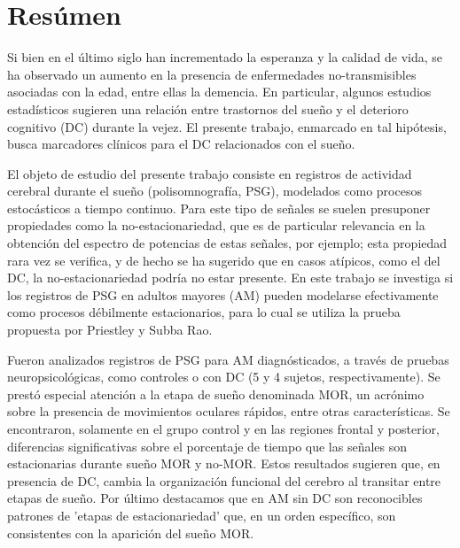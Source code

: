 \documentclass[12pt,a4paper]{mitthesis}
\begin{document}
\setcounter{page}{1}

\chapter*{Res\'umen}

{\small

Si bien en el \'ultimo siglo han incrementado la esperanza y la calidad de vida, se ha observado 
\cite{PlanAlzheimer04} un aumento en la presencia de enfermedades no-transmisibles asociadas con 
la edad, entre ellas la demencia.
En particular, algunos estudios estad\'isticos \cite{Amer13,Miyata13,Potvin12} sugieren una 
relaci\'on entre trastornos del sue\~no y el deterioro cognitivo (DC) durante la vejez.
El presente trabajo, enmarcado en tal hip\'otesis, busca marcadores cl\'inicos para el DC
relacionados con el sue\~no.

El objeto de estudio del presente trabajo consiste en registros de actividad cerebral durante el 
sue\~no (polisomnograf\'ia, PSG), modelados como procesos estoc\'asticos a tiempo continuo. Para 
este tipo de se\~nales se suelen presuponer propiedades como la no-estacionariedad, que es de 
particular relevancia en la obtenci\'on del espectro de potencias de estas se\~nales, por ejemplo; 
esta propiedad rara vez se verifica, y de hecho se ha sugerido \cite{McEwen75,Cohen77,Sugimoto78} 
que en casos at\'ipicos, como el del DC, la no-estacionariedad podr\'ia no estar presente. 
En este trabajo se investiga si los registros de PSG en adultos mayores (AM) pueden modelarse 
efectivamente como procesos d\'ebilmente estacionarios, para lo cual se utiliza la prueba propuesta 
por Priestley y Subba Rao.

Fueron analizados registros de PSG para AM diagn\'osticados, a trav\'es de pruebas 
neuropsicol\'ogicas, como controles o con DC (5 y 4 sujetos, respectivamente). 
Se prest\'o especial atenci\'on a la etapa de sue\~no denominada MOR, un acr\'onimo sobre la 
presencia de movimientos oculares r\'apidos, entre otras caracter\'isticas.
Se encontraron, solamente en el grupo control y en las regiones frontal y posterior, diferencias 
significativas sobre el porcentaje de tiempo que las se\~nales son estacionarias durante sue\~no 
MOR y no-MOR.
Estos resultados sugieren que, en presencia de DC, cambia la organizaci\'on funcional del cerebro 
al transitar entre etapas de sue\~no.
Por \'ultimo destacamos que en AM sin DC son reconocibles patrones de 'etapas de estacionariedad' 
que, en un orden espec\'ifico, son consistentes con la aparici\'on del sue\~no MOR.

}
\end{document}
